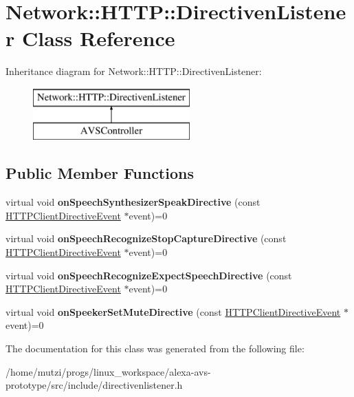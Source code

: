 \hypertarget{classNetwork_1_1HTTP_1_1DirectivenListener}{}\section{Network\+:\+:H\+T\+TP\+:\+:Directiven\+Listener Class Reference}
\label{classNetwork_1_1HTTP_1_1DirectivenListener}
Inheritance diagram for Network\+:\+:H\+T\+TP\+:\+:Directiven\+Listener\+:\begin{figure}[H]
\begin{center}
\leavevmode
\includegraphics[height=2.000000cm]{dd/d01/classNetwork_1_1HTTP_1_1DirectivenListener}
\end{center}
\end{figure}
\subsection*{Public Member Functions}
\begin{DoxyCompactItemize}
\item 
\mbox{\label{classNetwork_1_1HTTP_1_1DirectivenListener_a7bee132b3a6e4627a6f867af38df6a2a}} 
virtual void {\bfseries on\+Speech\+Synthesizer\+Speak\+Directive} (const \hyperlink{classNetwork_1_1HTTP_1_1HTTPClientDirectiveEvent}{H\+T\+T\+P\+Client\+Directive\+Event} $\ast$event)=0
\item 
\mbox{\label{classNetwork_1_1HTTP_1_1DirectivenListener_a85b39ee362f07c68a066ce787c8d7430}} 
virtual void {\bfseries on\+Speech\+Recognize\+Stop\+Capture\+Directive} (const \hyperlink{classNetwork_1_1HTTP_1_1HTTPClientDirectiveEvent}{H\+T\+T\+P\+Client\+Directive\+Event} $\ast$event)=0
\item 
\mbox{\label{classNetwork_1_1HTTP_1_1DirectivenListener_af0ad2595a831168a5a783ac857e3d3e2}} 
virtual void {\bfseries on\+Speech\+Recognize\+Expect\+Speech\+Directive} (const \hyperlink{classNetwork_1_1HTTP_1_1HTTPClientDirectiveEvent}{H\+T\+T\+P\+Client\+Directive\+Event} $\ast$event)=0
\item 
\mbox{\label{classNetwork_1_1HTTP_1_1DirectivenListener_a2dba0d0b3f2ccf34eed83f8f7bb8973f}} 
virtual void {\bfseries on\+Speeker\+Set\+Mute\+Directive} (const \hyperlink{classNetwork_1_1HTTP_1_1HTTPClientDirectiveEvent}{H\+T\+T\+P\+Client\+Directive\+Event} $\ast$event)=0
\end{DoxyCompactItemize}


The documentation for this class was generated from the following file\+:\begin{DoxyCompactItemize}
\item 
/home/mutzi/progs/linux\+\_\+workspace/alexa-\/avs-\/prototype/src/include/directivenlistener.\+h\end{DoxyCompactItemize}
